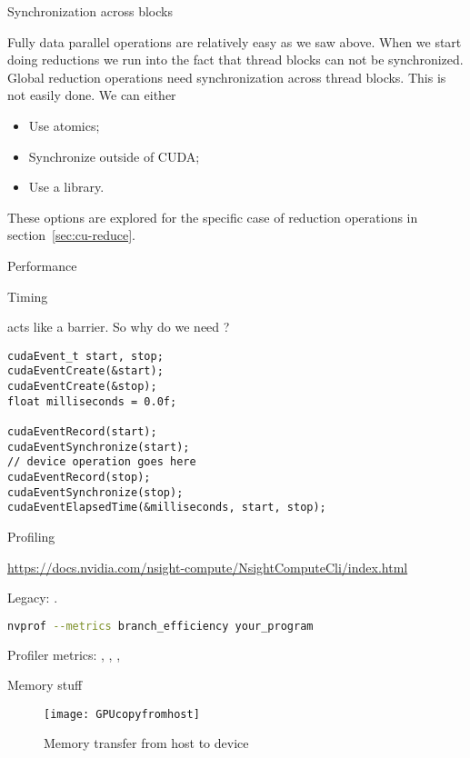  {Synchronization across blocks}

Fully data parallel operations are relatively easy
as we saw above.
When we start doing reductions we run into the fact that
thread blocks can not be synchronized.
Global reduction operations need synchronization across thread blocks.
This is not easily done. We can either
\begin{itemize}
\item Use atomics;
\item Synchronize outside of CUDA;
\item Use a library.
\end{itemize}

These options are explored for the specific case of reduction operations
in section~\ref{sec:cu-reduce}.

 {Performance}

 {Timing}

 acts like a barrier.
So why do we need ?

\begin{lstlisting}
cudaEvent_t start, stop;
cudaEventCreate(&start);
cudaEventCreate(&stop);
float milliseconds = 0.0f;
 
cudaEventRecord(start);
cudaEventSynchronize(start);
// device operation goes here
cudaEventRecord(stop);
cudaEventSynchronize(stop);
cudaEventElapsedTime(&milliseconds, start, stop);
\end{lstlisting}

 {Profiling}

\url{https://docs.nvidia.com/nsight-compute/NsightComputeCli/index.html}

\begin{remark}
  Legacy: .
\begin{lstlisting}[language=bash]
nvprof --metrics branch_efficiency your_program
\end{lstlisting}
\end{remark}

Profiler metrics:
,
,
,

 {Memory stuff}

\begin{figure}[ht]
  \texttt{[image: GPUcopyfromhost]}
  \caption{Memory transfer from host to device}
\end{figure}

